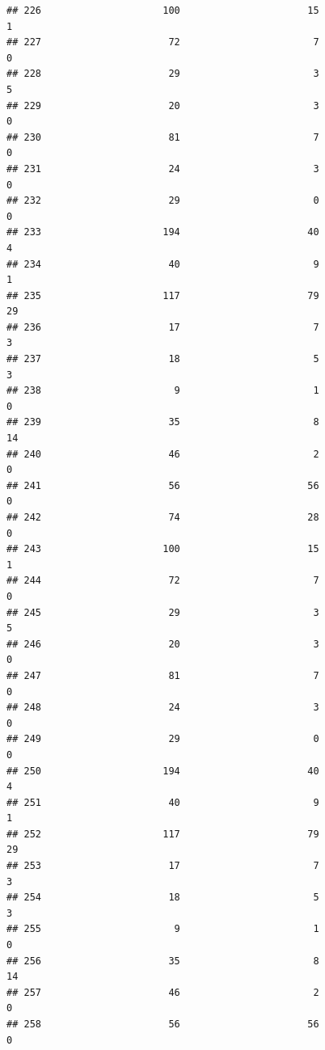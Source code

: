 \documentclass[
]{article}
\begin{document}
\begin{verbatim}
## 226                     100                      15                        1
## 227                      72                       7                        0
## 228                      29                       3                        5
## 229                      20                       3                        0
## 230                      81                       7                        0
## 231                      24                       3                        0
## 232                      29                       0                        0
## 233                     194                      40                        4
## 234                      40                       9                        1
## 235                     117                      79                       29
## 236                      17                       7                        3
## 237                      18                       5                        3
## 238                       9                       1                        0
## 239                      35                       8                       14
## 240                      46                       2                        0
## 241                      56                      56                        0
## 242                      74                      28                        0
## 243                     100                      15                        1
## 244                      72                       7                        0
## 245                      29                       3                        5
## 246                      20                       3                        0
## 247                      81                       7                        0
## 248                      24                       3                        0
## 249                      29                       0                        0
## 250                     194                      40                        4
## 251                      40                       9                        1
## 252                     117                      79                       29
## 253                      17                       7                        3
## 254                      18                       5                        3
## 255                       9                       1                        0
## 256                      35                       8                       14
## 257                      46                       2                        0
## 258                      56                      56                        0

\end{verbatim}
\end{document}
